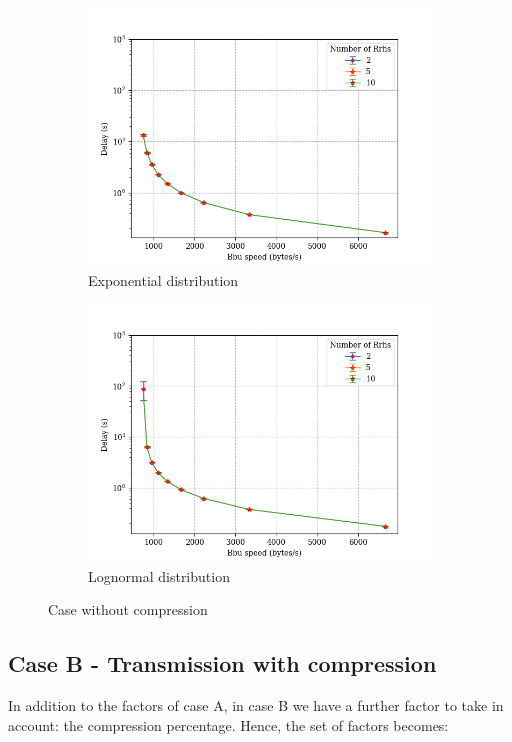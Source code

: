 \documentclass[11pt,a4paper,oneside, openright]{article}
\begin{document}
\begin{figure}
\centering
\begin{subfigure}{.5\textwidth}
  \centering
  \includegraphics[width=\linewidth]{images/case-a-exp}
  \caption{Exponential distribution}
  \label{fig:case-a-exp}
\end{subfigure}%
\begin{subfigure}{.5\textwidth}
  \centering
  \includegraphics[width=\linewidth]{images/case-a-logn}
  \caption{Lognormal distribution}
  \label{fig:case-a-log}
\end{subfigure}
\caption{Case without compression}
\label{fig:case-a}
\end{figure}

\subsection{Case B - Transmission with compression}
In addition to the factors of case A, in case B we have a further factor to take in account: the compression percentage. Hence, the set of factors becomes:
\end{document}
